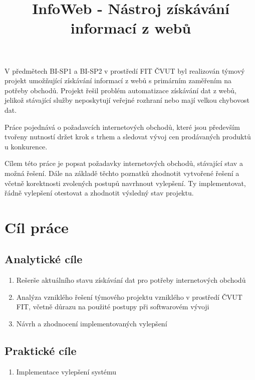 \documentclass[thesis=B,czech]{FITthesis}[2012/06/26]
\title{ InfoWeb - Nástroj získávání informací z webů }
\begin{document}

\begin{introduction}

V předmětech BI-SP1 a BI-SP2 v prostředí FIT ČVUT byl realizován týmový projekt umožňující získávání informací z webů s primárním zaměřením na potřeby obchodů. Projekt řešil problém automatizace získávání dat z webů, jelikož stávající služby neposkytují veřejné rozhraní
nebo mají velkou chybovost dat.
\par
Práce pojednává o požadavcích internetových obchodů, které jsou především tvořeny nutností držet krok s trhem a sledovat vývoj cen
prodávaných produktů u konkurence.
\par
Cílem této práce je popsat požadavky internetových obchodů, stávající stav a možná řešení. Dále na základě těchto poznatků
zhodnotit vytvořené řešení a včetně korektnosti zvolených postupů navrhnout vylepšení. Ty implementovat, řádně vylepšení
otestovat a zhodnotit výsledný stav projektu.


\newpage

\newpage

\end{introduction}

\chapter{Cíl práce}

\section{Analytické cíle}

\begin{enumerate}  
\item Rešerše aktuálního stavu získávání dat pro potřeby
internetových obchodů
\item Analýza vzniklého řešení týmového projektu vzniklého v prostředí ČVUT FIT,
včetně důrazu na použité postupy při softwarovém vývoji
\item Návrh a zhodnocení implementovaných vylepšení
\end{enumerate}

\section{Praktické cíle}
\begin{enumerate}  
\item Implementace vylepšení systému
\end{enumerate}
\end{document}

